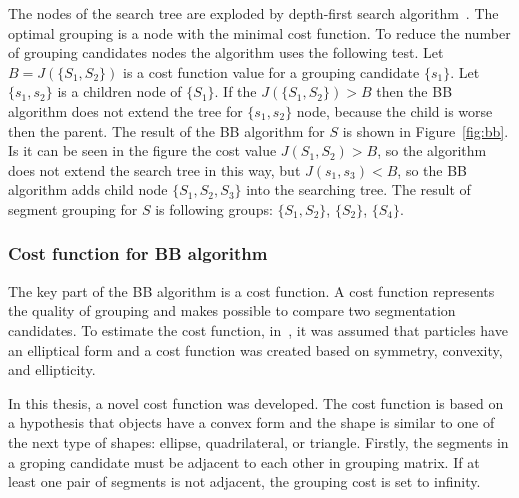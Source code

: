 \documentclass{lutmscthesis}[2010/09/22]
\begin{document}
The nodes of the search tree are exploded by depth-first search algorithm~\cite{zafari-bb}. The optimal grouping is a node with the minimal cost function. To reduce the number of grouping candidates nodes the algorithm uses the following test. Let $B = J(\{S_1,S_2\})$ is a cost function value for a grouping candidate $\{s_1\}$.  Let $\{s_1,s_2\}$ is a children node of $\{S_1\}$. If the $J(\{S_1,S_2\})>B$ then the BB algorithm does not extend the tree for $\{s_1,s_2\}$ node, because the child is worse then the parent.
The result of the BB algorithm for $S$ is shown in Figure~\ref{fig:bb}. Is it can be seen in the figure the cost value $J(S_1,S_2)>B$, so the algorithm does not extend the search tree in this way, but $J(s_1,s_3)<B$, so the BB algorithm adds child node $\{S_1,S_2,S_3\}$ into the searching tree. The result of segment grouping for $S$ is following groups: $\{S_1,S_2\}$, $\{S_2\}$, $\{S_4\}$. 


\begin{figure}[htp]
\end{figure}

\subsubsection{Cost function for BB algorithm}

The key part of the BB algorithm is a cost function. A cost function represents the quality of grouping and makes possible to compare two segmentation candidates. To estimate the cost function, in~\cite{zafari-bb}, it was assumed that particles have an elliptical form and a cost function was created based on symmetry, convexity, and ellipticity.

In this thesis, a novel cost function was developed. The cost function is based on a hypothesis that objects have a convex form and the shape is similar to one of the next type of shapes: ellipse, quadrilateral, or triangle. 
Firstly, the segments in a groping candidate must be adjacent to each other in grouping matrix. If at least one pair of segments is not adjacent, the grouping cost is set to infinity.
\end{document}
